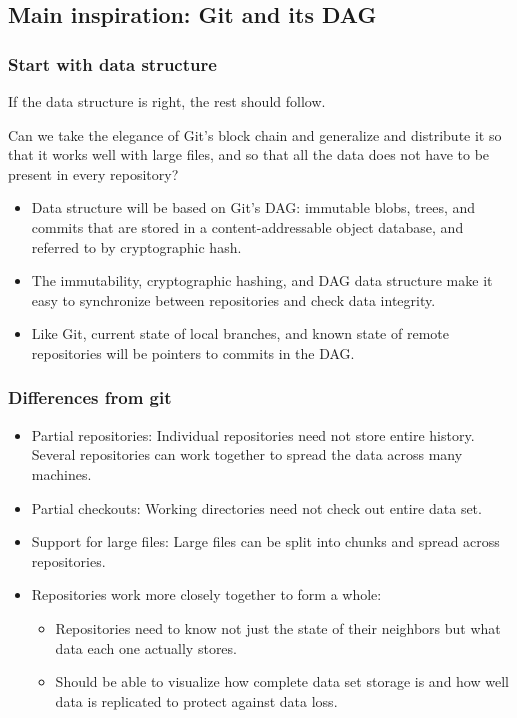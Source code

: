 \documentclass[a4paper]{article}
\begin{document}
\subsection{Main inspiration: Git and its DAG}\label{main-inspiration-git}

\subsubsection{Start with data structure}

If the data structure is right, the rest should follow.

Can we take the elegance of Git's block chain and generalize and
distribute it so that it works well with large files, and so that all
the data does not have to be present in every repository?

\begin{itemize}
\item
  Data structure will be based on Git's DAG: immutable blobs, trees, and commits
  that are stored in a content-addressable object database, and referred to by
  cryptographic hash.
\item
  The immutability, cryptographic hashing, and DAG data structure make it easy
  to synchronize between repositories and check data integrity.
\item
  Like Git, current state of local branches, and known state of remote
  repositories will be pointers to commits in the DAG.
\end{itemize}

\subsubsection{Differences from git}

\begin{itemize}
\item
  Partial repositories: Individual repositories need not store entire
  history. Several repositories can work together to spread the data
  across many machines.
\item
  Partial checkouts: Working directories need not check out entire data
  set.
\item
  Support for large files: Large files can be split into chunks and
  spread across repositories.
\item
  Repositories work more closely together to form a whole:

  \begin{itemize}
  \item
    Repositories need to know not just the state of their neighbors but what
    data each one actually stores.
  \item
    Should be able to visualize how complete data set storage is and how
    well data is replicated to protect against data loss.
  \end{itemize}
\end{itemize}
\end{document}
